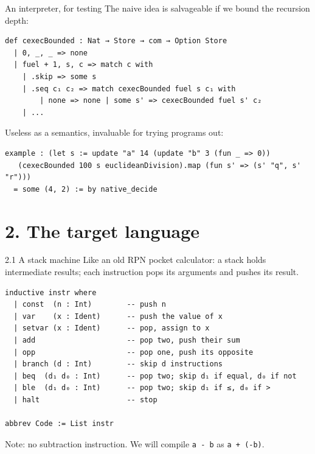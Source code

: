 \documentclass[aspectratio=169,10pt]{beamer}
\newcommand{\code}[1]{\texttt{\small #1}}
\begin{document}
\begin{frame}[fragile]{An interpreter, for testing}
The naive idea is salvageable if we bound the recursion depth:
\begin{lstlisting}
def cexecBounded : Nat → Store → com → Option Store
  | 0, _, _ => none
  | fuel + 1, s, c => match c with
    | .skip => some s
    | .seq c₁ c₂ => match cexecBounded fuel s c₁ with
        | none => none | some s' => cexecBounded fuel s' c₂
    | ...
\end{lstlisting}
Useless as a semantics, invaluable for trying programs out:
\begin{lstlisting}
example : (let s := update "a" 14 (update "b" 3 (fun _ => 0))
   (cexecBounded 100 s euclideanDivision).map (fun s' => (s' "q", s' "r")))
  = some (4, 2) := by native_decide
\end{lstlisting}
\end{frame}

\section{2. The target language}

\begin{frame}[fragile]{2.1 A stack machine}
Like an old RPN pocket calculator: a stack holds intermediate results;
each instruction pops its arguments and pushes its result.
\begin{lstlisting}
inductive instr where
  | const  (n : Int)        -- push n
  | var    (x : Ident)      -- push the value of x
  | setvar (x : Ident)      -- pop, assign to x
  | add                     -- pop two, push their sum
  | opp                     -- pop one, push its opposite
  | branch (d : Int)        -- skip d instructions
  | beq  (d₁ d₀ : Int)      -- pop two; skip d₁ if equal, d₀ if not
  | ble  (d₁ d₀ : Int)      -- pop two; skip d₁ if ≤, d₀ if >
  | halt                    -- stop

abbrev Code := List instr
\end{lstlisting}
Note: no subtraction instruction.  We will compile \code{a - b} as
\code{a + (-b)}.
\end{frame}
\end{document}
